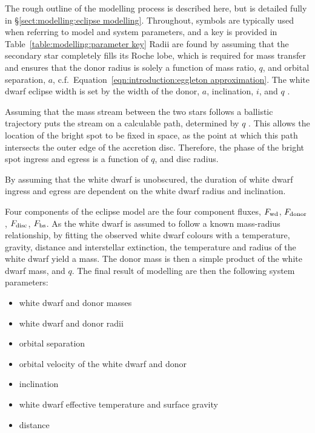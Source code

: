 The rough outline of the modelling process is described here, but is detailed fully in \S\ref{sect:modelling:eclipse modelling}. Throughout, symbols are typically used when referring to model and system parameters, and a key is provided in Table~\ref{table:modelling:parameter key}
Radii are found by assuming that the secondary star completely fills its Roche lobe, which is required for mass transfer and ensures that the donor radius is solely a function of mass ratio, $q$, and orbital separation, $a$, c.f.~Equation~\ref{eqn:introduction:eggleton approximation}. The white dwarf eclipse width is set by the width of the donor, $a$, inclination, $i$, and $q$ \citep{bailey1979}.

Assuming that the mass stream between the two stars follows a ballistic trajectory puts the stream on a calculable path, determined by $q$ \citep{Lubow1975}. This allows the location of the bright spot to be fixed in space, as the point at which this path intersects the outer edge of the accretion disc. Therefore, the phase of the bright spot ingress and egress is a function of $q$, and disc radius.

By assuming that the white dwarf is unobscured, the duration of white dwarf ingress and egress are dependent on the white dwarf radius and inclination.

Four components of the eclipse model are the four component fluxes, $F_{\rm wd}$, $F_{\rm donor}$, $F_{\rm disc}$, $F_{\rm bs}$.
As the white dwarf is assumed to follow a known mass-radius relationship, by fitting the observed white dwarf colours with a temperature, gravity, distance and interstellar extinction, the temperature and radius of the white dwarf yield a mass. The donor mass is then a simple product of the white dwarf mass, and $q$.
The final result of modelling are then the following system parameters:
\begin{itemize}
    \setlength\itemsep{0em}
    \item white dwarf and donor masses
    \item white dwarf and donor radii
    \item orbital separation
    \item orbital velocity of the white dwarf and donor
    \item inclination
    \item white dwarf effective temperature and surface gravity
    \item distance
\end{itemize}

